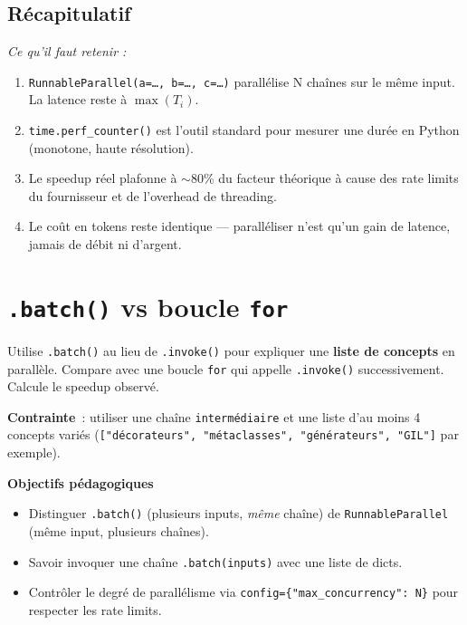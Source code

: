 \documentclass[11pt,a4paper]{article}
\begin{document}
\subsection*{Récapitulatif}
{\itshape\sloppy
\textit{Ce qu'il faut retenir :}
\begin{enumerate}[leftmargin=*]
  \item \texttt{RunnableParallel(a=\dots, b=\dots, c=\dots)} parallélise
        N chaînes sur le même input. La latence reste à $\max(T_i)$.
  \item \texttt{time.perf\_counter()} est l'outil standard pour mesurer
        une durée en Python (monotone, haute résolution).
  \item Le speedup réel plafonne à $\sim$80\% du facteur théorique à cause
        des rate limits du fournisseur et de l'overhead de threading.
  \item Le coût en tokens reste identique — paralléliser n'est qu'un gain
        de latence, jamais de débit ni d'argent.
\end{enumerate}
\par}

\section{\texttt{.batch()} vs boucle \texttt{for}}

\begin{tcolorbox}[title=Exercice bonus 2. Paralléliser plusieurs \emph{inputs} sur la même chaîne]
Utilise \texttt{.batch()} au lieu de \texttt{.invoke()} pour expliquer
une \textbf{liste de concepts} en parallèle. Compare avec une boucle
\texttt{for} qui appelle \texttt{.invoke()} successivement. Calcule le
speedup observé.

\textbf{Contrainte}~: utiliser une chaîne \texttt{intermédiaire} et une
liste d'au moins 4 concepts variés (\texttt{["décorateurs", "métaclasses",
"générateurs", "GIL"]} par exemple).

\bigskip
\noindent\textbf{Objectifs pédagogiques}
\begin{itemize}[leftmargin=*]
  \item Distinguer \texttt{.batch()} (plusieurs inputs, \emph{même} chaîne)
        de \texttt{RunnableParallel} (même input, plusieurs chaînes).
  \item Savoir invoquer une chaîne \texttt{.batch(inputs)} avec une liste
        de dicts.
  \item Contrôler le degré de parallélisme via
        \texttt{config=\{"max\_concurrency": N\}} pour respecter les
        rate limits.
\end{itemize}
\end{tcolorbox}
\end{document}
